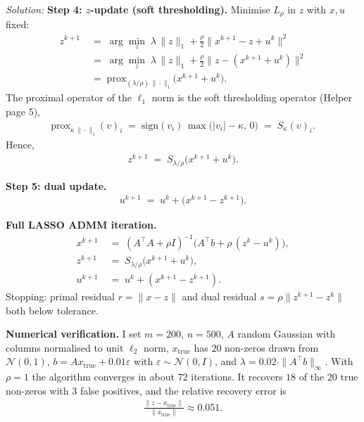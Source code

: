 \documentclass[a4paper, 11pt]{article}
\newenvironment{solution}
    {\textit{Solution:}}
    {}
\begin{document}
\begin{solution}
\textbf{Step 4: $z$-update (soft thresholding).} Minimise $L_{\rho}$ in $z$ with $x, u$ fixed:
\begin{align*}
    z^{k+1} &\;=\; \arg\min_z \; \lambda\, \|z\|_1 + \tfrac{\rho}{2} \|x^{k+1} - z + u^k\|^2 \\
    &\;=\; \arg\min_z \; \lambda\, \|z\|_1 + \tfrac{\rho}{2} \|z - (x^{k+1} + u^k)\|^2 \\
    &\;=\; \mathrm{prox}_{(\lambda / \rho)\,\|\cdot\|_1}\big(x^{k+1} + u^k\big).
\end{align*}
The proximal operator of the $\ell_1$ norm is the soft thresholding operator (Helper page 5),
\begin{align*}
    \mathrm{prox}_{\kappa\,\|\cdot\|_1}(v)_i \;=\; \mathrm{sign}(v_i)\, \max\big(|v_i| - \kappa,\, 0\big) \;=\; S_{\kappa}(v)_i.
\end{align*}
Hence,
\begin{align*}
    \boxed{\; z^{k+1} \;=\; S_{\lambda / \rho}\big(x^{k+1} + u^k\big). \;}
\end{align*}

\textbf{Step 5: dual update.}
\begin{align*}
    \boxed{\; u^{k+1} \;=\; u^k + \big(x^{k+1} - z^{k+1}\big). \;}
\end{align*}

\textbf{Full LASSO ADMM iteration.}
\begin{align*}
    x^{k+1} &\;=\; (A^{\top} A + \rho I)^{-1} \big( A^{\top} b + \rho\, (z^k - u^k) \big), \\
    z^{k+1} &\;=\; S_{\lambda / \rho}\big( x^{k+1} + u^k \big), \\
    u^{k+1} &\;=\; u^k + (x^{k+1} - z^{k+1}).
\end{align*}
Stopping: primal residual $r = \|x - z\|$ and dual residual $s = \rho \|z^{k+1} - z^{k}\|$ both below tolerance.

\textbf{Numerical verification.} I set $m = 200$, $n = 500$, $A$ random Gaussian with columns normalised to unit $\ell_2$ norm, $x_{\mathrm{true}}$ has $20$ non-zeros drawn from $\mathcal{N}(0, 1)$, $b = A x_{\mathrm{true}} + 0.01 \varepsilon$ with $\varepsilon \sim \mathcal{N}(0, I)$, and $\lambda = 0.02 \cdot \|A^{\top} b\|_{\infty}$. With $\rho = 1$ the algorithm converges in about $72$ iterations. It recovers $18$ of the $20$ true non-zeros with $3$ false positives, and the relative recovery error is
\begin{align*}
    \frac{\|z - x_{\mathrm{true}}\|}{\|x_{\mathrm{true}}\|} \approx 0.051.
\end{align*}


\end{solution}
\end{document}
